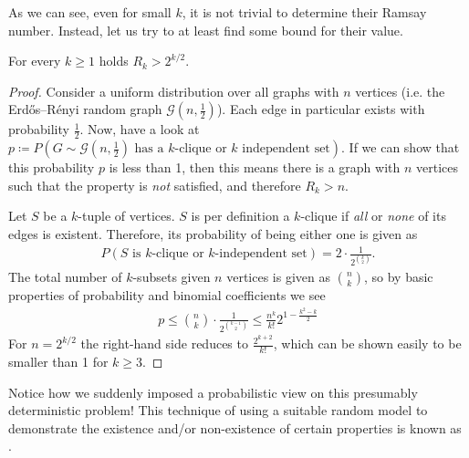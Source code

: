 As we can see, even for small $k$, it is not trivial to determine their Ramsay number.
Instead, let us try to at least find some bound for their value.
\begin{theorem}
    For every $k \geq 1$ holds $R_k > 2^{k/2}$.
\end{theorem}
\begin{proof}
    Consider a uniform distribution over all graphs with $n$ vertices (i.e. the Erdős–Rényi random graph $\mathcal{G}(n, \frac{1}{2})$).
    Each edge in particular exists with probability $\frac{1}{2}$.
    Now, have a look at $p \coloneqq P(G \sim \mathcal{G}(n, \frac{1}{2}) \text{ has a $k$-clique or $k$ independent set})$.
    If we can show that this probability $p$ is less than 1, then this means there is a graph with $n$ vertices such that the property is \emph{not} satisfied,
    and therefore $R_k > n$.

    Let $S$ be a $k$-tuple of vertices. $S$ is per definition a $k$-clique if \emph{all} or \emph{none} of its edges is existent.
    Therefore, its probability of being either one is given as
    \begin{align} \label{eq:cliqueprob}
        P(S \text{ is $k$-clique or $k$-independent set}) = 2 \cdot \frac{1}{2^{\binom{k}{2}}}.
    \end{align}
    The total number of $k$-subsets given $n$ vertices is given as $\binom{n}{k}$, so by basic properties of probability 
    and binomial coefficients we see
    \begin{align}
        p \leq \binom{n}{k} \cdot \frac{1}{2^{\binom{k-1}{2}}} \leq \frac{n^k}{k!} 2^{1-\frac{k^2-k}{2}} 
    \end{align}
    For $n = 2^{k/2}$ the right-hand side reduces to $\frac{2^{k+2}}{k!}$, which can be shown easily to be smaller than 1 for $k \geq 3$. 
\end{proof}
Notice how we suddenly imposed a probabilistic view on this presumably deterministic problem!
This technique of using a suitable random model to demonstrate the existence and/or non-existence of certain properties
is known as .

